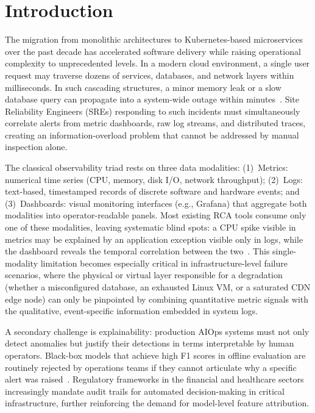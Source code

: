 \documentclass[5p, times]{elsarticle}
\begin{document}
\linenumbers

\section{Introduction}

The migration from monolithic architectures to Kubernetes-based microservices over the past decade has accelerated software delivery while raising operational complexity to unprecedented levels. In a
modern cloud environment, a single user request may traverse dozens of services, databases, and network layers within milliseconds. In such cascading structures, a minor memory leak or a slow database query can propagate into a system-wide outage within minutes~\cite{soldani2022}. Site Reliability Engineers (SREs) responding to such incidents must simultaneously correlate alerts from metric dashboards, raw log streams, and distributed traces, creating an information-overload problem that cannot be addressed by manual inspection alone.

The classical observability triad rests on three data modalities: (1)~Metrics: numerical time series (CPU, memory, disk I/O, network throughput); (2)~Logs: text-based, timestamped records of discrete software and hardware events; and
(3)~Dashboards: visual monitoring interfaces (e.g., Grafana) that aggregate both modalities into operator-readable panels. Most existing RCA tools consume only one of these modalities, leaving
systematic blind spots: a CPU spike visible in metrics may be explained by an application exception visible only in logs, while the dashboard reveals the temporal correlation between the two~\cite{instantops2024}. This single-modality limitation becomes especially critical in infrastructure-level failure scenarios, where the physical or virtual layer responsible for a degradation (whether a misconfigured database, an exhausted Linux VM, or a saturated CDN edge node) can only be pinpointed by combining quantitative metric signals with the qualitative, event-specific information embedded in system logs.

A secondary challenge is explainability: production AIOps systems must not only detect anomalies but justify their detections in terms interpretable by human operators. Black-box models that achieve high F1 scores in offline evaluation are routinely rejected by operations teams if they cannot articulate why a specific alert was raised~\cite{zhang2019cross}. Regulatory frameworks in the financial and healthcare sectors increasingly mandate audit trails for automated decision-making in critical infrastructure, further reinforcing the demand for model-level feature attribution.
\end{document}
